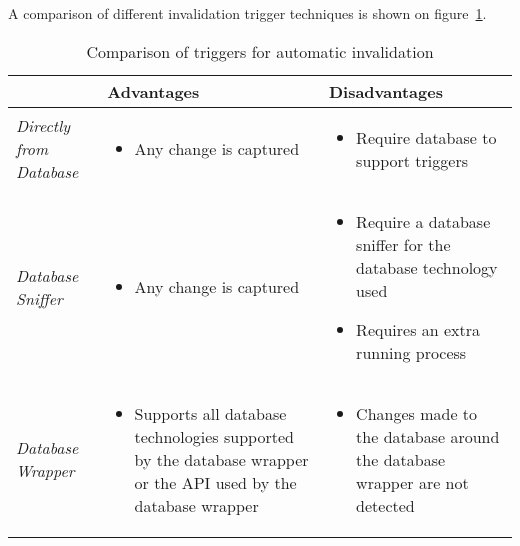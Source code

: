 A comparison of different invalidation trigger techniques is shown on figure~\ref{fig:invalidation-trigger-comparison}.

\begin{table}[ht!]
  \footnotesize
  \centering
  \begin{tabular}{lll}
    \hline
    & \textbf{Advantages} & \textbf{Disadvantages} \\
    \hline
    {
      \emph{Directly from Database}
    } & {
      \parbox{3.5cm}{
        \begin{itemize}[leftmargin=0.75em]
          \item Any change is captured
        \end{itemize}
      }
    } & {
      \parbox{3.5cm}{
        \begin{itemize}[leftmargin=0.75em]
          \item Require database to support triggers
        \end{itemize}
      }
    } \\
    \hline
    {
      \emph{Database Sniffer}
    } & {
      \parbox{3.5cm}{
        \begin{itemize}[leftmargin=0.75em]
          \item Any change is captured
        \end{itemize}
      }
    } & {
      \parbox{3.5cm}{
        \begin{itemize}[leftmargin=0.75em]
          \item Require a database sniffer for the database technology used
          \item Requires an extra running process
        \end{itemize}
      }
    } \\
    \hline
    {
      \emph{Database Wrapper}
    } & {
      \parbox{3.5cm}{
        \begin{itemize}[leftmargin=0.75em]
          \item Supports all database technologies supported by the database wrapper or the API used by the database wrapper
        \end{itemize}
      }
    } & {
      \parbox{3.5cm}{
        \begin{itemize}[leftmargin=0.75em]
          \item Changes made to the database around the database wrapper are not detected
        \end{itemize}
      }
    } \\
    \hline
  \end{tabular}
  \caption{Comparison of triggers for automatic invalidation}
  \label{fig:invalidation-trigger-comparison}
\end{table}

